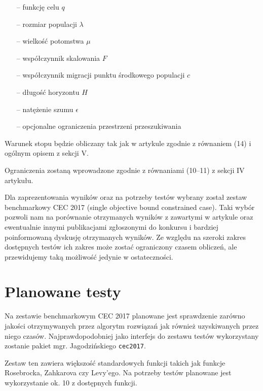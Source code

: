 \begin{itemize}
\item[--] funkcję celu $q$
\item[--] rozmiar populacji $\lambda$
\item[--] wielkość potomstwa $\mu$
\item[--] współczynnik skalowania $F$
\item[--] współczynnik migracji punktu środkowego populacji $c$
\item[--] długość horyzontu $H$
\item[--] natężenie szumu $\epsilon$
\item[--] opcjonalne ograniczenia przestrzeni przeszukiwania
\end{itemize}


Warunek stopu będzie obliczany tak jak w artykule zgodnie z równaniem (14) i ogólnym opisem z sekcji V.


Ograniczenia zostaną wprowadzone zgodnie z równaniami (10--11) z sekcji IV artykułu.


Dla zaprezentowania wyników oraz na potrzeby testów wybrany został zestaw benchmarkowy CEC 2017 (single objective bound constrained case). Taki wybór pozwoli nam na porównanie otrzymanych wyników z zawartymi w artykule oraz ewentualnie innymi publikacjami zgłoszonymi do konkursu i bardziej poinformowaną dyskusję otrzymanych wyników. Ze względu na szeroki zakres dostępnych testów ich zakres może zostać ograniczony czasem obliczeń, ale przewidujemy taką możliwość jedynie w ostateczności.

\section{Planowane testy}
Na zestawie benchmarkowym CEC 2017 planowane jest sprawdzenie zarówno jakości otrzymywanych przez algorytm rozwiązań jak również uzyskiwanych przez niego czasów. Najprawdopodobniej jako interfejs do zestawu testów wykorzystany zostanie pakiet mgr. Jagodzińskiego \verb+cec2017+.

Zestaw ten zawiera większość standardowych funkcji takich jak funkcje Rosebrocka, Zahkarova czy Levy'ego. Na potrzeby testów planowane jest wykorzystanie ok. 10 z dostępnych funkcji.

